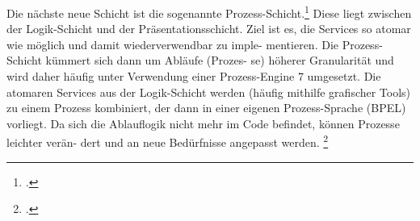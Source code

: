 \documentclass{lehramt-informatik-haupt}
\begin{document}
Die nächste neue Schicht ist die sogenannte
Prozess-Schicht.\footcite[Seite 17]{sosy:fs:4} Diese liegt zwischen der
Logik-Schicht und der Präsentationsschicht. Ziel ist es, die Services so
atomar wie möglich und damit wiederverwendbar zu imple- mentieren. Die
Prozess-Schicht kümmert sich dann um Abläufe (Prozes- se) höherer
Granularität und wird daher häufig unter Verwendung einer Prozess-Engine
7 umgesetzt. Die atomaren Services aus der Logik-Schicht werden (häufig
mithilfe grafischer Tools) zu einem Prozess kombiniert, der dann in
einer eigenen Prozess-Sprache (\zB BPEL) vorliegt. Da sich die
Ablauflogik nicht mehr im Code befindet, können Prozesse leichter verän-
dert und an neue Bedürfnisse angepasst werden.
\footcite[Seite 214-215]{schatten}

\literatur
\end{document}
